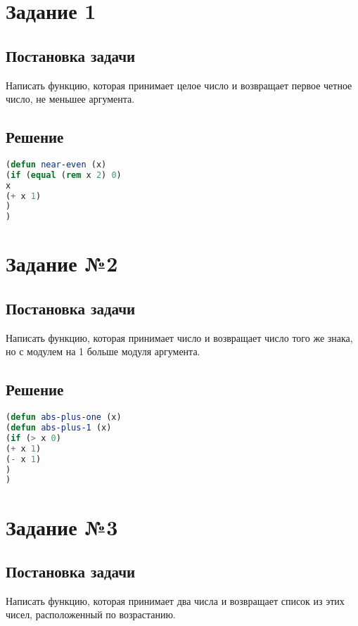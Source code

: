 \section*{Задание 1}
\subsection*{Постановка задачи}

Написать функцию, которая принимает целое число и возвращает первое четное число, не меньшее аргумента. 

\subsection*{Решение}

\begin{lstlisting}[label=first,caption=Решение задания №1, language=lisp]
(defun near-even (x) 
(if (equal (rem x 2) 0)
x
(+ x 1)
)
)

\end{lstlisting}

\section*{Задание №2}
\subsection*{Постановка задачи}
Написать функцию, которая принимает число и возвращает число того же знака, но с модулем на 1 больше модуля аргумента.

\subsection*{Решение}

\begin{lstlisting}[label=second,caption=Решение задания №2, language=lisp]
(defun abs-plus-one (x)
(defun abs-plus-1 (x) 
(if (> x 0)
(+ x 1)
(- x 1)
)
)
\end{lstlisting}

\section*{Задание №3}
\subsection*{Постановка задачи}
Написать функцию, которая принимает два числа и возвращает список из этих чисел, расположенный по возрастанию.

